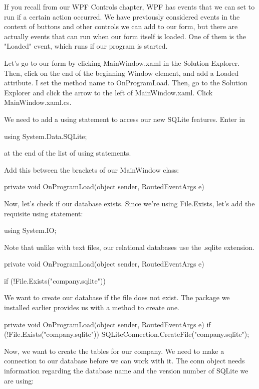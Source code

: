 \documentclass[oneside, openany] {book}
\begin{document}
If you recall from our WPF Controls chapter, WPF has events that we can set to run if a certain action occurred. We have previously considered events in the context of buttons and other controls we can add to our form, but there are actually events that can run when our form itself is loaded. One of them is the "Loaded" event, which runs if our program is started.

Let's go to our form by clicking MainWindow.xaml in the Solution Explorer. Then, click on the end of the beginning Window element, and add a Loaded attribute. I set the method name to OnProgramLoad. Then, go to the Solution Explorer and click the arrow to the left of MainWindow.xaml. Click MainWindow.xaml.cs.

We need to add a using statement to access our new SQLite features. Enter in 
\begin{CSharp}
using System.Data.SQLite;
\end{CSharp}
at the end of the list of using statements.


Add this between the brackets of our MainWindow class:
\begin{CSharp}
private void OnProgramLoad(object sender, RoutedEventArgs e)
        {

        }
\end{CSharp}
Now, let's check if our database exists. Since we're using File.Exists, let's add the requisite using statement:
\begin{CSharp}
using System.IO;
\end{CSharp}
Note that unlike with text files, our relational databases use the .sqlite extension.
\begin{CSharp}
private void OnProgramLoad(object sender, RoutedEventArgs e)
        {
            if (!File.Exists("company.sqlite"))
            {
                
            }
        }
\end{CSharp}

We want to create our database if the file does not exist. The package we installed earlier provides us with a method to create one.

\begin{CSharp}
private void OnProgramLoad(object sender, RoutedEventArgs e)
        {
            if (!File.Exists("company.sqlite"))
            {
                SQLiteConnection.CreateFile("company.sqlite");
            }
        }
\end{CSharp}
Now, we want to create the tables for our company. We need to make a connection to our database before we can work with it. The conn object needs information regarding the database name and the version number of SQLite we are using:
\end{document}
